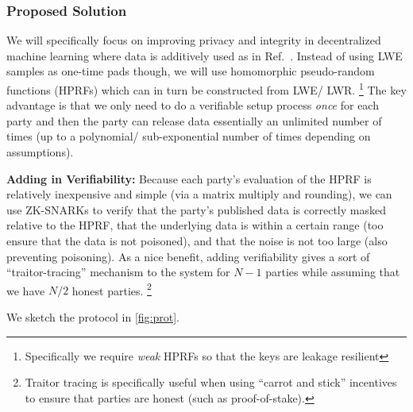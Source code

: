 \documentclass[11pt]{article}
\begin{document}
\subsubsection*{Proposed Solution}
We will specifically focus on improving privacy and integrity in decentralized machine learning where data is additively used as in Ref.~\cite{stevens2021efficientdifferentiallyprivatesecure}.
Instead of using LWE samples as one-time pads though, we will use homomorphic pseudo-random functions (HPRFs)  which can in turn be constructed from LWE/ LWR.
\footnote{Specifically we require \emph{weak} HPRFs so that the keys are leakage resilient}
The key advantage is that we only need to do a verifiable setup process \emph{once} for each party and then the party can release data essentially an unlimited number of times (up to a polynomial/ sub-exponential number of times depending on assumptions).

\textbf{Adding in Verifiability:} Because each party's evaluation of the HPRF is relatively inexpensive and simple (via a matrix multiply and rounding), we can use ZK-SNARKs to verify that the party's published data is correctly masked relative to the HPRF, that the underlying data is within a certain range (too ensure that the data is not poisoned), and that the noise is not too large (also preventing poisoning).
As a nice benefit, adding verifiability gives a sort of ``traitor-tracing'' mechanism to the system for $N - 1$ parties while assuming that we have $N /2$ honest parties.
\footnote{Traitor tracing is specifically useful when using ``carrot and stick'' incentives to ensure that parties are honest (such as proof-of-stake).}

We sketch the protocol in \cref{fig:prot}.
\end{document}
